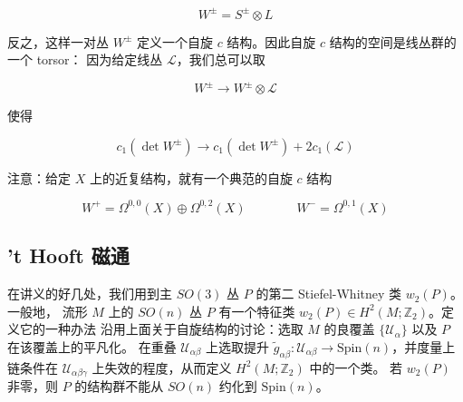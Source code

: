 
\begin{equation}
  W^{\pm} = S^{\pm}\otimes L
  \tag{G.20}
  \label{eq:G.20}
\end{equation}

反之，这样一对丛 $W^{\pm}$ 定义一个自旋 $c$ 结构。因此自旋 $c$ 结构的空间是线丛群的一个 torsor：
因为给定线丛 $\mathcal{L}$，我们总可以取

\begin{equation}
  W^{\pm} \to W^{\pm}\otimes\mathcal{L}
  \tag{G.21}
  \label{eq:G.21}
\end{equation}

使得

\begin{equation}
  c_1(\det W^{\pm}) \to c_1(\det W^{\pm}) + 2c_1(\mathcal{L})
  \tag{G.22}
  \label{eq:G.22}
\end{equation}

注意：给定 $X$ 上的近复结构，就有一个典范的自旋 $c$ 结构

\begin{equation}
  W^{+} = \Omega^{0,0}(X)\oplus\Omega^{0,2}(X)
  \qquad\qquad
  W^{-} = \Omega^{0,1}(X)
  \tag{G.23}
  \label{eq:G.23}
\end{equation}


\subsection{'t Hooft 磁通} %

在讲义的好几处，我们用到主 $SO(3)$ 丛 $P$ 的第二 Stiefel-Whitney 类 $w_2(P)$。一般地，
流形 $M$ 上的 $SO(n)$ 丛 $P$ 有一个特征类 $w_2(P)\in H^2(M;\mathbb{Z}_2)$。定义它的一种办法
沿用上面关于自旋结构的讨论：选取 $M$ 的良覆盖 $\{\mathcal{U}_\alpha\}$ 以及 $P$ 在该覆盖上的平凡化。
在重叠 $\mathcal{U}_{\alpha\beta}$ 上选取提升
$\tilde{g}_{\alpha\beta}:\mathcal{U}_{\alpha\beta}\to\mathrm{Spin}(n)$，并度量上链条件在
$\mathcal{U}_{\alpha\beta\gamma}$ 上失效的程度，从而定义 $H^2(M;\mathbb{Z}_2)$ 中的一个类。
若 $w_2(P)$ 非零，则 $P$ 的结构群不能从 $SO(n)$ 约化到 $\mathrm{Spin}(n)$。

